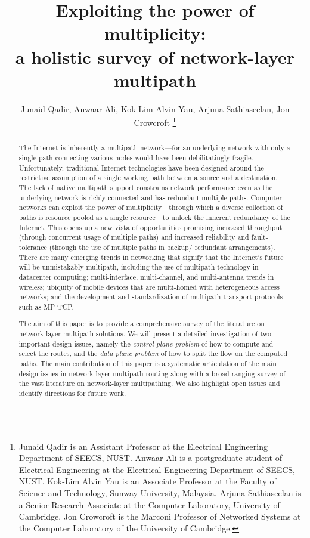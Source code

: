 \documentclass[10pt]{IEEEtran}
\begin{document}
\title{Exploiting the power of multiplicity: \\a holistic survey of network-layer multipath}
\author{Junaid Qadir, Anwaar Ali, Kok-Lim Alvin Yau, Arjuna Sathiaseelan, Jon Crowcroft 
\thanks{Junaid Qadir is an Assistant Professor at the Electrical Engineering Department of SEECS, NUST. Anwaar Ali is a postgraduate student of Electrical Engineering at the Electrical Engineering Department of SEECS, NUST. Kok-Lim Alvin Yau is an Associate Professor at the Faculty of Science and Technology, Sunway University, Malaysia. Arjuna Sathiaseelan is a Senior Research Associate at the Computer Laboratory, University of Cambridge. Jon Crowcroft is the Marconi Professor of Networked Systems at the Computer Laboratory of the University of Cambridge.}
}
\maketitle

\begin{abstract}

The Internet is inherently a multipath network---for an underlying network with only a single path connecting various nodes would have been debilitatingly fragile. Unfortunately, traditional Internet technologies have been designed around the restrictive assumption of a single working path between a source and a destination. The lack of native multipath support constrains network performance even as the underlying network is richly connected and has redundant multiple paths. Computer networks can exploit the power of multiplicity---through which a diverse collection of paths is resource pooled as a single resource---to unlock the inherent redundancy of the Internet. This opens up a new vista of opportunities promising increased throughput (through concurrent usage of multiple paths) and increased reliability and fault-tolerance (through the use of multiple paths in backup/ redundant arrangements). There are many emerging trends in networking that signify that the Internet's future will be unmistakably multipath,  including the use of multipath technology in datacenter computing; multi-interface, multi-channel, and multi-antenna trends in wireless; ubiquity of mobile devices that are multi-homed with heterogeneous access networks; and the development and standardization of multipath transport protocols such as MP-TCP. 

The aim of this paper is to provide a comprehensive survey of the literature on network-layer multipath solutions. We will present a detailed investigation of two important design issues, namely the \textit{control plane problem} of how to compute and select the routes, and the \textit{data plane problem} of how to split the flow on the computed paths. The main contribution of this paper is a systematic articulation of the main design issues in network-layer multipath routing along with a broad-ranging survey of the vast literature on network-layer multipathing. We also highlight open issues and identify directions for future work.



\end{abstract}
\end{document}
